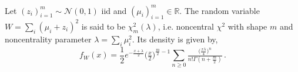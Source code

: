 \documentclass[a4paper,10pt]{article}
\begin{document}
Let $(z_i)_{i=1}^m \sim \mathcal{N}(0, 1)$ iid and $
  (\mu_i)_{i=1}^m \in \mathbb{R}
$. The random variable $
  W = \sum_i (\mu_i + z_i)^2
$ is said to be $\chi^2_m(\lambda)$, i.e. noncentral $\chi^2$ with shape $m$ and noncentrality
parameter $\lambda = \sum_i \mu_i^2$. Its density is given by, \cite{citation_needed}
$$
f_W(x)
  = \frac12 e^{- \tfrac{x + \lambda}2} \bigl(\tfrac{x}2\bigr)^{\tfrac{m}2 - 1}
    \sum_{n \geq 0} \tfrac{
      \bigl(\tfrac{x \lambda}4\bigr)^n
    }{
      n! \Gamma(n + \tfrac{m}2)
    }
  \,. $$
\end{document}
